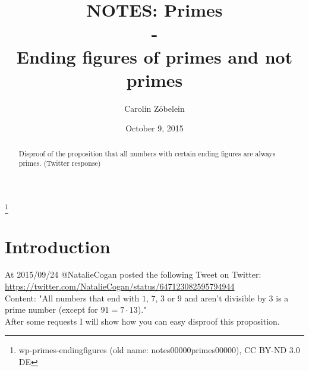 \documentclass{amsart}
\begin{document}
\title[NOTES: Primes - Ending figures]{NOTES: Primes\\
- \\
Ending figures of primes and not primes}

\author{Carolin Z\"obelein}
\thanks{wp-primes-endingfigures (old name: notes00000primes00000), CC BY-ND 3.0 DE}

\date{October 9, 2015}

\begin{abstract}
	Disproof of the proposition that all numbers with certain ending figures are always primes. (Twitter response)
\end{abstract}

\maketitle
\section{Introduction}
\label{s:introduction}
At 2015/09/24 @NatalieCogan posted the following Tweet on Twitter: \url{https://twitter.com/NatalieCogan/status/647123082595794944}\\
Content: "All numbers that end with $1$, $7$, $3$ or $9$ and aren't divisible by $3$ is a prime number (except for $91=7\cdot 13$)."\\
After some requests I will show how you can easy disproof this proposition.
\end{document}
